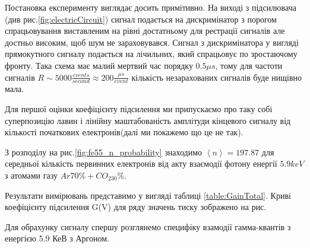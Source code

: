 \documentclass[pdftex,14pt]{scrartcl}
\def\mean#1{\left< #1 \right>}
\begin{document}
	
	
		
	Постановка експерименту виглядає досить примітивно. На виході з підсилювача (див рис.\ref{fig:electricCircuit}) сигнал подається на дискримінатор з порогом спрацьовування виставленим на рівні достатньому для реєтрації сигналів але достньо високим, щоб шум не зараховувався. Сигнал з дискримінатора у вигляді прямокутного сигналу подається на лічильних, який спрацьовує по зростаючому фронту. Така схема має малий мертвий час порядку $0.5 \mu s$, тому для частоти сигналів $R \sim 5000 \frac{events}{second} \approx 200 \frac{\mu s}{event}$ кількість незарахованих сигналів буде нищівно мала.
	
	Для першої оцінки коефіцієнту підсилення ми припускаємо про таку собі суперпозицію лавин і лінійну маштабованість амплітуди кінцевого сигналу від кількості початкових електронів(далі ми покажемо що це не так).
	
	З розподілу на рис.\ref{fig:fe55_n_probability} знаходимо $\mean{n} = 197.87$ для середньої кількість первинних електронів від акту взаємодії фотону енергії $5.9 keV$ з атомами газу  $Ar70\%+CO_230\%$.
	
	Результати вимірювань представимо у вигляді таблиці \ref{table:GainTotal}. Криві коефіцієнту підсилення G(V) для ряду значень тиску зображено на рис.
	
	Для обрахунку сигналу спершу розглянемо специфіку взамодії гамма-квантів з енергією 5.9 КеВ з Аргоном.
	
\end{document}
